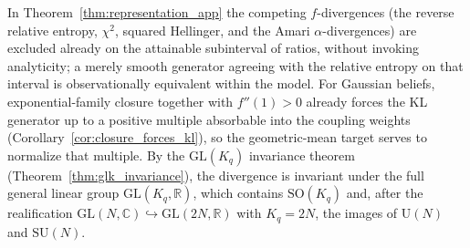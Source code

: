 In Theorem~\ref{thm:representation_app} the competing $f$-divergences (the reverse relative entropy, $\chi^2$, squared Hellinger, and the Amari $\alpha$-divergences) are excluded already on the attainable subinterval of ratios, without invoking analyticity; a merely smooth generator agreeing with the relative entropy on that interval is observationally equivalent within the model. For Gaussian beliefs, exponential-family closure together with $f''(1) > 0$ already forces the KL generator up to a positive multiple absorbable into the coupling weights (Corollary~\ref{cor:closure_forces_kl}), so the geometric-mean target serves to normalize that multiple. By the $\mathrm{GL}(K_q)$ invariance theorem (Theorem~\ref{thm:glk_invariance}), the divergence is invariant under the full general linear group $\mathrm{GL}(K_q, \mathbb{R})$, which contains $\mathrm{SO}(K_q)$ and, after the realification $\mathrm{GL}(N, \mathbb{C}) \hookrightarrow \mathrm{GL}(2N, \mathbb{R})$ with $K_q = 2N$, the images of $\mathrm{U}(N)$ and $\mathrm{SU}(N)$.

